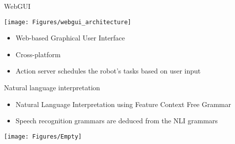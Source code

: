 \documentclass[12pt,a4paper]{article}
\newcommand{\emptylogo}{\texttt{[image: Figures/Empty]}}
\begin{document}
\begin{slidetop}
\begin{multicols}{2}
\begin{bclogo}[couleur = white, arrondi = 0.25, couleurBord = tuedarkblue , barre = none, logo=\emptylogo]{\textcolor{tuedarkblue}{WebGUI}}
\medskip %
\begin{minipage}[T]{\textwidth}
    \begin{center}
        \texttt{[image: Figures/webgui\_architecture]}
    \end{center}
\end{minipage}
\begin{itemize}[itemsep = 0pt, parsep = 0pt, leftmargin=15pt]
	\item Web-based Graphical User Interface
	\item Cross-platform
	\item Action server schedules the robot's tasks based on user input
\end{itemize}
\end{bclogo}

\vspace{-0.83cm} %

\begin{bclogo}[couleur = white, arrondi = 0.25, couleurBord = tuedarkblue, barre = none, logo=\emptylogo]{\textcolor{tuedarkblue}{Natural language interpretation}}
\medskip %
\begin{itemize}[itemsep = 0pt, parsep = 0pt, leftmargin=15pt]
	\item Natural Language Interpretation using Feature Context Free Grammar
	\item Speech recognition grammars are deduced from the NLI grammars
\end{itemize}
\end{bclogo}

\texttt{[image: Figures/Empty]}
\end{multicols}
\end{slidetop}
\end{document}
